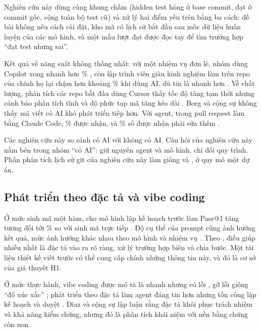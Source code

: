 Nghiên cứu này dùng cùng khung chấm (hidden test hỏng ở base commit, đạt ở commit gốc, cộng toàn bộ test cũ) và
xử lý hai điểm yếu trên bằng ba cách: đề bài không nêu cách cài đặt, kho mã có lịch sử bắt đầu sau mốc dữ liệu
huấn luyện của các mô hình, và một mẫu lượt đạt được đọc tay để tìm trường hợp ``đạt test nhưng sai''.

Kết quả về năng suất không thống nhất: với một nhiệm vụ đơn lẻ, nhóm dùng Copilot xong nhanh hơn
\NumLitPengFasterPct{}\% \cite{peng_2023}, còn lập trình viên giàu kinh nghiệm làm trên repo của chính họ
lại chậm hơn khoảng \NumLitBeckerSlowerPct{}\% khi dùng AI, dù tin là nhanh hơn \cite{becker_2025}. Về chất lượng, phân tích các repo bắt đầu dùng Cursor thấy tốc độ tăng tạm thời
nhưng cảnh báo phân tích tĩnh và độ phức tạp mã tăng kéo dài \cite{he_2026}. Borg và cộng sự
\cite{borg_2025} không thấy mã viết có AI khó phát triển tiếp hơn. Với agent, trong
\NumLitWatanabePRs{} pull request làm bằng Claude Code, \NumLitWatanabeMergedPct{}\% được nhận, và
\NumLitWatanabeReworkPct{}\% số được nhận phải sửa thêm \cite{watanabe_2025}.

Các nghiên cứu này so sánh có AI với không có AI. Câu hỏi của nghiên cứu này nằm bên trong nhóm ``có AI'':
giữ nguyên agent và mô hình, chỉ đổi quy trình. Phần phân tích lịch sử git của nghiên cứu này làm giống \cite{he_2026} và
\cite{watanabe_2025}, ở quy mô một dự án.

\subsection{Phát triển theo đặc tả và vibe coding}

Ở mức sinh mã một hàm, cho mô hình lập kế hoạch trước làm Pass@1 tăng tương đối tới
\NumLitJiangGainPct{}\% so với sinh mã trực tiếp \cite{jiang_2024}. Độ cụ thể của prompt cũng ảnh hưởng
kết quả, mức ảnh hưởng khác nhau theo mô hình và nhiệm vụ \cite{murr_2023,zi_2025}. Theo
\cite{zi_2025}, điều giúp nhiều nhất là đặc tả vào ra rõ ràng, xử lý trường hợp biên và chia bước. Một tài
liệu thiết kế viết trước có thể cung cấp chính những thông tin này, và đó là cơ sở của giả thuyết H1.

Ở mức thực hành, vibe coding được mô tả là nhanh nhưng có lỗi \cite{fawzy_2026}, gỡ lỗi giống ``đổ
xúc xắc'' \cite{chou_2025}; phát triển theo đặc tả làm agent đáng tin hơn nhưng tốn công lập kế hoạch và
duyệt \cite{agarwal_2026}. Diaz và cộng sự \cite{diaz_2026} lập luận rằng đặc tả khôi phục trách nhiệm và
khả năng kiểm chứng, nhưng đó là phân tích khái niệm với nền bằng chứng còn non.

